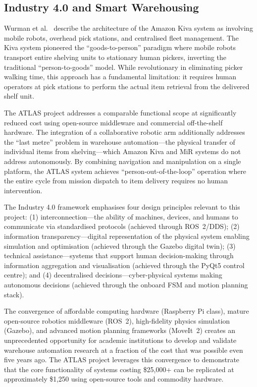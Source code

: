 \documentclass[12pt,a4paper,oneside]{report}
\begin{document}
\subsection{Industry 4.0 and Smart Warehousing}

Wurman et al.~\cite{wurman2008} describe the architecture of the Amazon Kiva system as involving mobile robots, overhead pick stations, and centralised fleet management. The Kiva system pioneered the ``goods-to-person'' paradigm where mobile robots transport entire shelving units to stationary human pickers, inverting the traditional ``person-to-goods'' model. While revolutionary in eliminating picker walking time, this approach has a fundamental limitation: it requires human operators at pick stations to perform the actual item retrieval from the delivered shelf unit.

The ATLAS project addresses a comparable functional scope at significantly reduced cost using open-source middleware and commercial off-the-shelf hardware. The integration of a collaborative robotic arm additionally addresses the ``last metre'' problem in warehouse automation---the physical transfer of individual items from shelving---which Amazon Kiva and MiR systems do not address autonomously. By combining navigation and manipulation on a single platform, the ATLAS system achieves ``person-out-of-the-loop'' operation where the entire cycle from mission dispatch to item delivery requires no human intervention.

The Industry 4.0 framework emphasises four design principles relevant to this project: (1) interconnection---the ability of machines, devices, and humans to communicate via standardised protocols (achieved through ROS~2/DDS); (2) information transparency---digital representation of the physical system enabling simulation and optimisation (achieved through the Gazebo digital twin); (3) technical assistance---systems that support human decision-making through information aggregation and visualisation (achieved through the PyQt5 control centre); and (4) decentralised decisions---cyber-physical systems making autonomous decisions (achieved through the onboard FSM and motion planning stack).

The convergence of affordable computing hardware (Raspberry Pi class), mature open-source robotics middleware (ROS~2), high-fidelity physics simulation (Gazebo), and advanced motion planning frameworks (MoveIt~2) creates an unprecedented opportunity for academic institutions to develop and validate warehouse automation research at a fraction of the cost that was possible even five years ago. The ATLAS project leverages this convergence to demonstrate that the core functionality of systems costing \$25,000+ can be replicated at approximately \$1,250 using open-source tools and commodity hardware.
\end{document}
